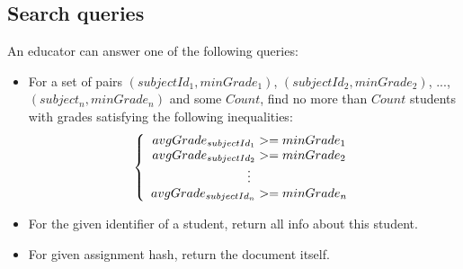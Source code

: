 \subsection{Search queries}
\label{sec:search-queries}

An educator can answer one of the following queries:
\begin{itemize}
\item For a set of pairs $(subjectId_1, minGrade_1)$, $(subjectId_2, minGrade_2)$, ..., $(subject_n, minGrade_n)$ and some $Count$, find no more than $Count$  students with grades satisfying the following inequalities:
\[
\left\{
\begin{array}{c}
avgGrade_{subjectId_1} >= minGrade_1 \\ avgGrade_{subjectId_2} >= minGrade_2 \\
\mathrel{\makebox[\widthof{=}]{\vdots}} \\ avgGrade_{subjectId_n} >= minGrade_n
\end{array}
\right.
\]

\item For the given identifier of a student, return all info about this student.
\item For given assignment hash, return the document itself.
\end{itemize}

